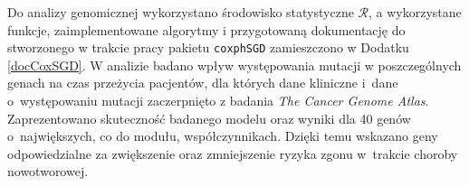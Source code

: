 Do analizy genomicznej wykorzystano środowisko statystyczne $\mathcal{R}$, a wykorzystane funkcje, zaimplementowane algorytmy i przygotowaną dokumentację do stworzonego w trakcie pracy pakietu \texttt{coxphSGD} zamieszczono w Dodatku \ref{docCoxSGD}. W analizie badano wpływ występowania mutacji w poszczególnych genach na czas przeżycia pacjentów, dla których dane kliniczne i~dane o~występowaniu mutacji zaczerpnięto z badania \textit{The Cancer Genome Atlas}. Zaprezentowano skuteczność badanego modelu oraz wyniki dla 40 genów o~największych, co do modułu, współczynnikach. Dzięki temu wskazano geny odpowiedzialne za zwiększenie oraz zmniejszenie ryzyka zgonu w~trakcie choroby nowotworowej.